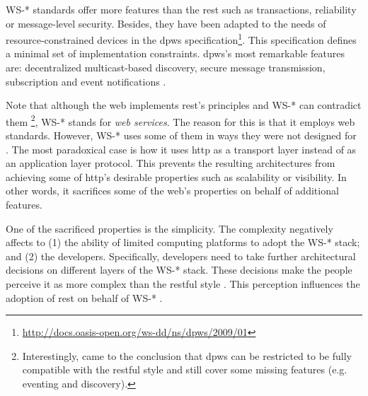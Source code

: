 WS-* standards offer more features than the \ac{rest} such as transactions, reliability or message-level security.
Besides, they have been adapted to the needs of resource-constrained devices in the \ac{dpws} specification\footnote{\url{http://docs.oasis-open.org/ws-dd/ns/dpws/2009/01}}.
This specification defines a minimal set of implementation constraints.
\ac{dpws}'s most remarkable features are: decentralized multicast-based discovery, secure message transmission, subscription and event notifications \citep{moritz_devices_2010}.


Note that although the web implements \ac{rest}'s principles and WS-* can contradict them
\footnote{Interestingly, \citet{moritz_devices_2010} came to the conclusion that \ac{dpws} can be restricted to be fully compatible with the \ac{rest}ful style and still cover some missing features (e.g. eventing and discovery).},
WS-* stands for \emph{web services}. %
The reason for this is that it employs web standards. %
However, WS-* uses some of them in ways they were not designed for \citep{krummenacher_www_2005}.
The most paradoxical case is how it uses \ac{http} as a transport layer instead of as an application layer protocol.
This prevents the resulting architectures from achieving some of \ac{http}'s desirable properties such as scalability or visibility.
In other words, it sacrifices some of the web's properties on behalf of additional features.


One of the sacrificed properties is the simplicity.
The complexity negatively affects to
(1) the ability of limited computing platforms to adopt the WS-* stack; and %
(2) the developers.
Specifically, developers need to take further architectural decisions on different layers of the WS-* stack.
These decisions make the people perceive it as more complex than the \ac{rest}ful style \citep{guinard_search_2011}.
This perception influences the adoption of \ac{rest} on behalf of WS-* \citep{davis_perceived_1989,legris_why_2003}.


